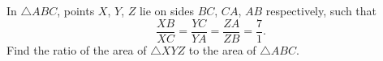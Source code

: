 In $\triangle ABC$, points $X$, $Y$, $Z$ lie on sides $BC$, $CA$, $AB$ respectively, such that
\[\dfrac{XB}{XC}=\dfrac{YC}{YA}=\dfrac{ZA}{ZB}=\dfrac71.\]
Find the ratio of the area of $\triangle XYZ$ to the area of $\triangle ABC$.
